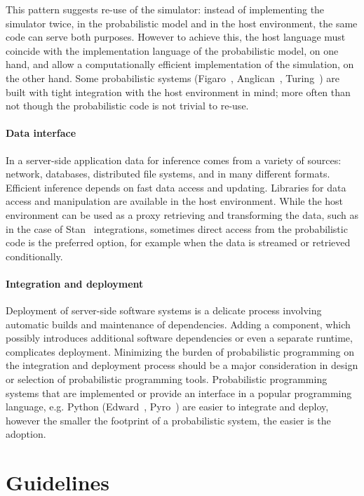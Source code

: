 \documentclass[sigplan,review,10pt,anonymous]{acmart}
\begin{document}
\begin{sloppypar}
This pattern suggests re-use of the simulator: instead of
implementing the simulator twice, in the probabilistic model and
in the host environment, the same code can serve both purposes.
However to achieve this, the host language must coincide with
the implementation language of the probabilistic model, on one
hand, and allow a computationally efficient implementation of
the simulation, on the other hand. Some probabilistic systems
(Figaro~\cite{P09}, Anglican~\cite{TMY+16}, Turing~\cite{GXG18})
are built with tight integration with the host environment in
mind; more often than not though the probabilistic code is
not trivial to re-use.

\paragraph{Data interface} In a server-side application data
for inference comes from a variety of sources: network,
databases, distributed file systems, and in many different
formats. Efficient inference depends on fast data access and
updating. Libraries for data access and manipulation are
available in the host environment. While the host environment
can be used as a proxy retrieving and transforming the data,
such as in the case of Stan~\cite{Stan17} integrations,
sometimes direct access from the probabilistic code is the
preferred option, for example when the data is streamed or
retrieved conditionally. 

\paragraph{Integration and deployment} Deployment of server-side
software systems is a delicate process involving automatic
builds and maintenance of dependencies. Adding  a component,
which possibly introduces additional software dependencies or
even a separate runtime, complicates deployment. Minimizing the
burden of probabilistic programming on the integration
and deployment process should be a major consideration in
design or selection of probabilistic programming tools.
Probabilistic programming systems that are implemented or 
provide an interface in a popular programming language, e.g.
Python (Edward~\cite{THS+17}, Pyro~\cite{Pyro18}) are easier
to integrate and deploy, however the smaller the footprint
of a probabilistic system, the easier is the adoption.

\section{Guidelines}


\end{sloppypar}
\end{document}
